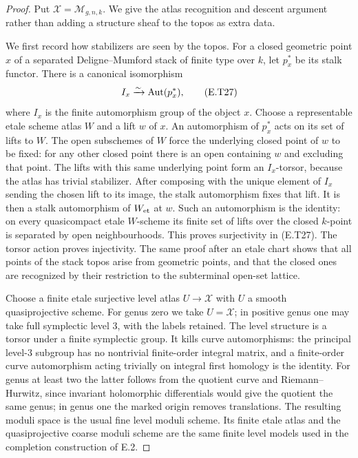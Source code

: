 \begin{proof}
Put $\mathcal X=\mathcal M_{g,n,k}$.  We give the atlas
recognition and descent argument rather than adding a
structure sheaf to the topos as extra data.

We first record how stabilizers are seen by the topos.
For a closed geometric point $x$ of a separated
Deligne--Mumford stack of finite type over $k$, let $p_x^*$
be its stalk functor.  There is a canonical isomorphism
\[
                   I_x\xrightarrow{\sim}\operatorname{Aut}(p_x^*),         \tag{E.T27}
\]
where $I_x$ is the finite automorphism group of the object
$x$.  Choose a representable etale scheme atlas $W$ and a
lift $w$ of $x$.  An automorphism of $p_x^*$ acts on its
set of lifts to $W$.  The open subschemes of $W$ force the
underlying closed point of $w$ to be fixed: for any other
closed point there is an open containing $w$ and excluding
that point.  The lifts with this same underlying point form
an $I_x$-torsor, because the atlas has trivial stabilizer.
After composing with the unique element of $I_x$ sending
the chosen lift to its image, the stalk automorphism fixes
that lift.  It is then a stalk automorphism of $W_{\rm et}$
at $w$.  Such an automorphism is the identity: on every
quasicompact etale $W$-scheme its finite set of lifts over the closed
$k$-point is separated by open neighbourhoods.  This proves
surjectivity in (E.T27).  The torsor action proves injectivity.
The same proof after an etale chart shows that all points of
the stack topos arise from geometric points, and that the
closed ones are recognized by their restriction to the
subterminal open-set lattice.

Choose a finite etale surjective level atlas
$U\to\mathcal X$ with $U$ a smooth quasiprojective scheme.
For genus zero we take $U=\mathcal X$; in positive genus
one may take full symplectic level $3$, with the labels
retained.  The level structure is a torsor under a finite
symplectic group.  It kills curve automorphisms: the
principal level-$3$ subgroup has no nontrivial finite-order
integral matrix, and a finite-order curve automorphism
acting trivially on integral first homology is the identity.
For genus at least two the latter follows from the
quotient curve and Riemann--Hurwitz, since invariant
holomorphic differentials would give the quotient the
same genus; in genus one the marked origin removes
translations.  The resulting moduli space is the usual
fine level moduli scheme.  Its finite etale atlas and the
quasiprojective coarse moduli scheme are the same finite
level models used in the completion construction of E.2.


\end{proof}

